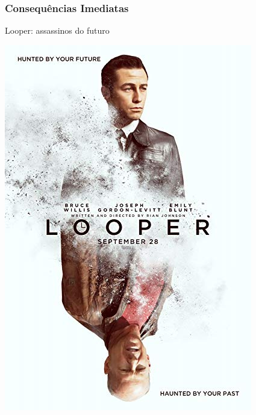 \begin{frame}
    \frametitle{Consequências Imediatas}
    
    \alert{Looper: assassinos do futuro}

    \includegraphics[height=0.8\textheight]{img/posters/looper.jpg}
\end{frame}

